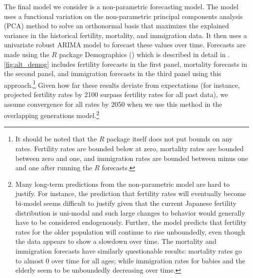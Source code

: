 \documentclass[10pt]{article}
\renewcommand{\thesection}{\arabic{section}}
\renewcommand{\thesubsection}{\thesection.\arabic{subsection}}
\renewcommand{\thesubsubsection}{\thesubsection.\arabic{subsubsection}}
\renewcommand{\subsubsection}[2][]{\oldsubsubsection[#1]{#2}\index{#1}\label{sec:\thesubsubsection}}
\numberwithin{equation}{subsection}
\begin{document}

\subsubsection{Alternate Forecasting}

\par The final model we consider is a non-parametric forecasting model. The model uses a functional variation on the non-parametric principal components analysis (PCA) method to solve an orthonormal basis that maximizes the explained variance in the historical fertility, mortality, and immigration data. It then uses a univariate robust ARIMA model to forecast these values over time. Forecasts are made using the \(R\) package Demographics (\cite{alt_demo}) which is described in detail in \cite{alt_demo_paper}. \autoref{fig:alt_demog} includes fertility forecasts in the first panel, mortality forecasts in the second panel, and immigration forecasts in the third panel using this approach.\footnote{It should be noted that the \(R\) package itself does not put bounds on any rates. Fertility rates are bounded below at zero, mortality rates are bounded between zero and one, and immigration rates are bounded between minus one and one after running the \(R\) forecasts.} Given how far these results deviate from expectations (for instance, projected fertility rates by 2100 surpass fertility rates for all past data), we assume convergence for all rates by 2050 when we use this method in the overlapping generations model.\footnote{Many long-term predictions from the non-parametric model are hard to justify. For instance, the prediction that fertility rates will eventually become bi-model seems difficult to justify given that the current Japanese fertility distribution is uni-modal and such large changes to behavior would generally have to be considered endogenously. Further, the model predicts that fertility rates for the older population will continue to rise unboundedly, even though the data appears to show a slowdown over time. The mortality and immigration forecasts have similarly questionable results: mortality rates go to almost 0 over time for all ages; while immigration rates for babies and the elderly seem to be unboundedly decreasing over time.}
\end{document}
